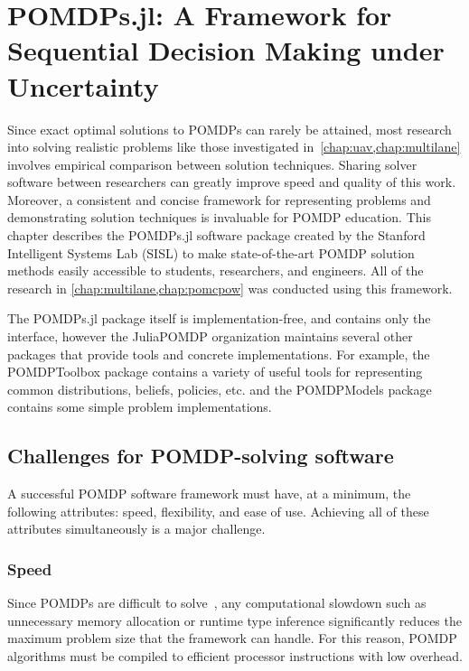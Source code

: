 \chapter{POMDPs.jl: A Framework for Sequential Decision Making under Uncertainty} \label{chap:pomdpsjl}

Since exact optimal solutions to POMDPs can rarely be attained, most research into solving realistic problems like those investigated in~\cref{chap:uav,chap:multilane} involves empirical comparison between solution techniques.
Sharing solver software between researchers can greatly improve speed and quality of this work.
Moreover, a consistent and concise framework for representing problems and demonstrating solution techniques is invaluable for POMDP education.
This chapter describes the POMDPs.jl software package created by the Stanford Intelligent Systems Lab (SISL) to make state-of-the-art POMDP solution methods easily accessible to students, researchers, and engineers.
All of the research in \cref{chap:multilane,chap:pomcpow} was conducted using this framework.

The POMDPs.jl package itself is implementation-free, and contains only the interface, however the JuliaPOMDP organization maintains several other packages that provide tools and concrete implementations. For example, the POMDPToolbox package contains a variety of useful tools for representing common distributions, beliefs, policies, etc. and the POMDPModels package contains some simple problem implementations.

\section{Challenges for POMDP-solving software}

A successful POMDP software framework must have, at a minimum, the following attributes: speed, flexibility, and ease of use. Achieving all of these attributes simultaneously is a major challenge.

\subsection{Speed}

Since POMDPs are difficult to solve~\cite{papadimitriou1987complexity}, any computational slowdown such as unnecessary memory allocation or runtime type inference significantly reduces the maximum problem size that the framework can handle.
For this reason, POMDP algorithms must be compiled to efficient processor instructions with low overhead.

